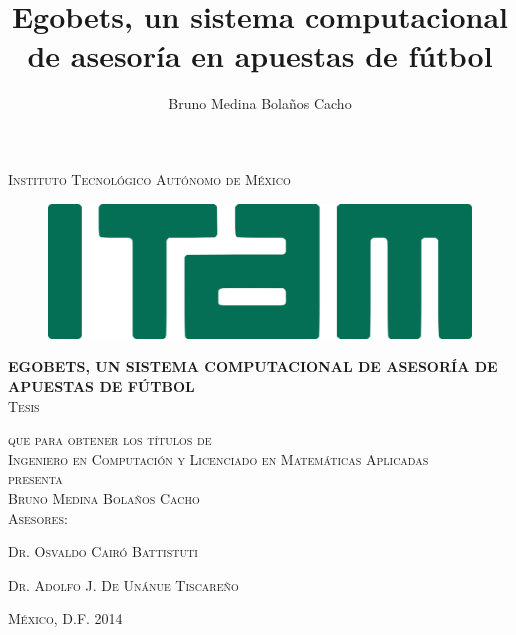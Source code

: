 
\title{Egobets, un sistema computacional de asesoría en apuestas de fútbol}
\author{Bruno Medina Bolaños Cacho}

\begin{titlepage}
\begin{center}

\textsc{\Large Instituto Tecnológico Autónomo de México}\\[3em]

\begin{figure}[ht]
\begin{center}
\includegraphics{resources/logo-ITAM}
\end{center}
\end{figure}

\vspace{2em}

\textsc\huge\textbf{EGOBETS, UN SISTEMA COMPUTACIONAL DE ASESORÍA DE APUESTAS DE FÚTBOL}\\[3em]


\textsc{\large Tesis}

\textsc{que para obtener los títulos de}\\[1em]

\textsc{Ingeniero en Computación y Licenciado en Matemáticas Aplicadas}\\[1em]

\textsc{presenta}\\[1em]

\textsc{\Large Bruno Medina Bolaños Cacho}\\[1em]

\textsc{\large Asesores:}

\textsc{\large Dr. Osvaldo Cairó Battistuti}

\textsc{\large Dr. Adolfo J. De Unánue Tiscareño}\\[1em]

\end{center}

\vspace*{\fill}
\textsc{México, D.F. \hspace*{\fill} 2014}

\end{titlepage}

